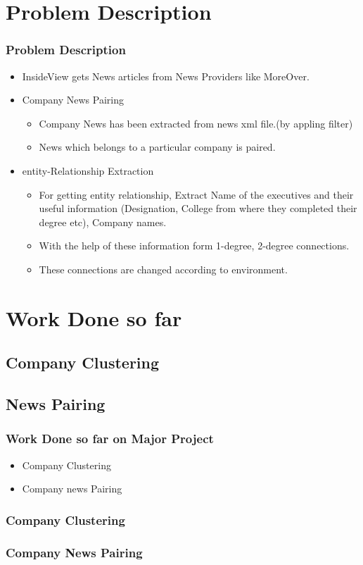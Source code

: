 \documentclass[10pt]{beamer}
\begin{document}
\section{Problem Description}
\begin{frame}
\frametitle{Problem Description}
\begin{itemize}
\item InsideView gets News articles from News Providers like MoreOver.
\item Company News Pairing
\begin{itemize}
\item Company News has been extracted from news xml file.(by appling filter)
\item News which belongs to a particular company is paired.
\end{itemize}
\item entity-Relationship Extraction
\begin{itemize}
\item For getting entity relationship, Extract Name of the executives and their useful information (Designation, College from where they completed their degree etc), Company names.
\item With the help of these information form 1-degree, 2-degree connections.
\item These connections are changed according to environment.
\end{itemize}
\end{itemize}
\end{frame}
\section{Work Done so far}
\subsection{Company Clustering}
\subsection{News Pairing}
\begin{frame}
\frametitle{Work Done so far on Major Project}
\begin{itemize}
\item Company Clustering\\

\item Company news Pairing\\

\end{itemize}
\end{frame}
\begin{frame}
\frametitle{Company Clustering}


\end{frame}
%
\begin{frame}
\frametitle{Company News Pairing}
\end{frame}
\end{document}
